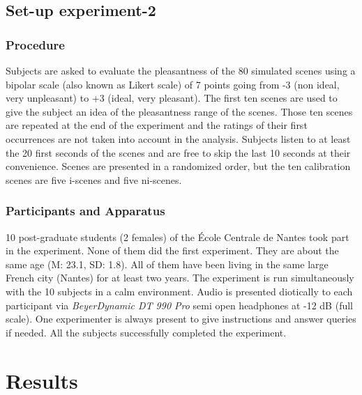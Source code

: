 \documentclass[twoside,twocolumn]{article}
\begin{document}
\subsection{Set-up experiment-2}
\label{sec:Experiment-2}
\subsubsection*{Procedure} 

Subjects are asked to evaluate the pleasantness of the 80 simulated scenes using a bipolar scale (also known as Likert scale) of 7 points going from -3 (non ideal, very unpleasant) to +3 (ideal, very pleasant). The first ten scenes are used to give the subject an idea of the pleasantness range of the scenes. Those ten scenes are repeated at the end of the experiment and the ratings of their first occurrences are not taken into account in the analysis. Subjects listen to at least the 20 first seconds of the scenes and are free to skip the last 10 seconds at their convenience. Scenes are presented in a randomized order, but the ten calibration scenes are five i-scenes and five ni-scenes. 

\subsubsection*{Participants and Apparatus}

10 post-graduate students (2 females) of the {\'E}cole Centrale de Nantes took part in the experiment. None of them did the first experiment. They are about the same age (M: 23.1, SD: 1.8). All of them have been living in the same large French city (Nantes) for at least two years. The experiment is run simultaneously with the 10 subjects in a calm environment. Audio is presented diotically to each participant via \textit{BeyerDynamic DT 990 Pro} semi open headphones at -12 dB (full scale). One experimenter is always present to give instructions and answer queries if needed. All the  subjects successfully completed the experiment. 

 
\section{Results}
\end{document}
